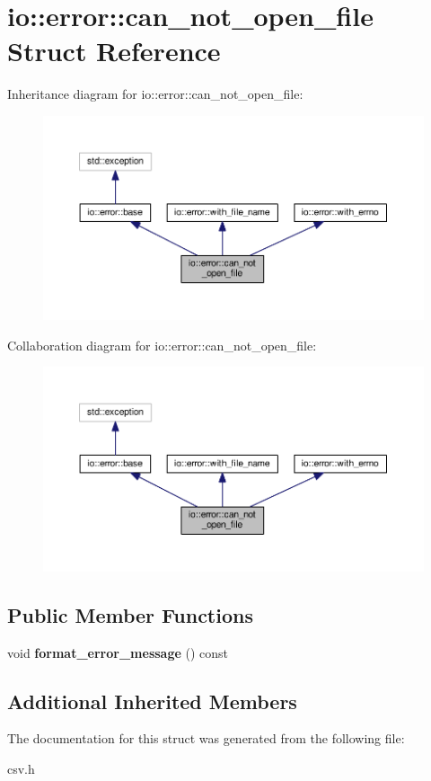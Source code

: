 \section{io\+:\+:error\+:\+:can\+\_\+not\+\_\+open\+\_\+file Struct Reference}
\label{structio_1_1error_1_1can__not__open__file}


Inheritance diagram for io\+:\+:error\+:\+:can\+\_\+not\+\_\+open\+\_\+file\+:\nopagebreak
\begin{figure}[H]
\begin{center}
\leavevmode
\includegraphics[width=350pt]{structio_1_1error_1_1can__not__open__file__inherit__graph}
\end{center}
\end{figure}


Collaboration diagram for io\+:\+:error\+:\+:can\+\_\+not\+\_\+open\+\_\+file\+:\nopagebreak
\begin{figure}[H]
\begin{center}
\leavevmode
\includegraphics[width=350pt]{structio_1_1error_1_1can__not__open__file__coll__graph}
\end{center}
\end{figure}
\subsection*{Public Member Functions}
\begin{DoxyCompactItemize}
\item 
void {\bfseries format\+\_\+error\+\_\+message} () const \label{structio_1_1error_1_1can__not__open__file_a6b4f1a5ebfdbf12c6ee53c781c94b203}

\end{DoxyCompactItemize}
\subsection*{Additional Inherited Members}


The documentation for this struct was generated from the following file\+:\begin{DoxyCompactItemize}
\item 
csv.\+h\end{DoxyCompactItemize}
